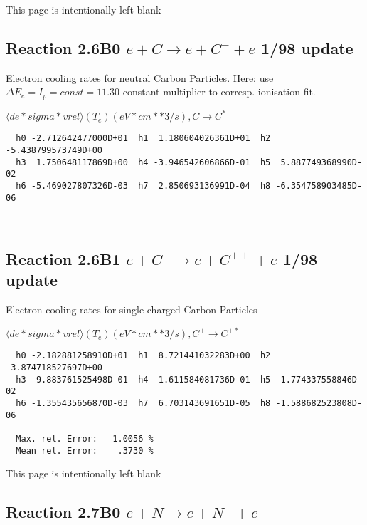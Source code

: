 \documentclass[12pt,dvipdfmx]{article}
\begin{document}
\newpage
This page is intentionally left blank
\newpage

\subsection{
Reaction 2.6B0 $e + C \rightarrow e + C^+ + e  $ 1/98 update
}

 Electron cooling rates for neutral
 Carbon Particles. Here: use $\Delta E_e = I_p = const = 11.30$
 constant multiplier to corresp. ionisation fit.

$  \langle de*sigma*vrel \rangle(T_e)  (eV*cm**3/s), C   \rightarrow C^* $


\begin{small}\begin{verbatim}
  h0 -2.712642477000D+01  h1  1.180604026361D+01  h2 -5.438799573749D+00
  h3  1.750648117869D+00  h4 -3.946542606866D-01  h5  5.887749368990D-02
  h6 -5.469027807326D-03  h7  2.850693136991D-04  h8 -6.354758903485D-06



\end{verbatim}\end{small}

\subsection{
Reaction 2.6B1 $e + C^+ \rightarrow e + C^{++} + e  $ 1/98 update
}

 Electron cooling rates for single
 charged Carbon Particles

 $ \langle de*sigma*vrel \rangle(T_e)  (eV*cm**3/s), C^+ \rightarrow C^{+*} $


\begin{small}\begin{verbatim}
  h0 -2.182881258910D+01  h1  8.721441032283D+00  h2 -3.874718527697D+00
  h3  9.883761525498D-01  h4 -1.611584081736D-01  h5  1.774337558846D-02
  h6 -1.355435656870D-03  h7  6.703143691651D-05  h8 -1.588682523808D-06

  Max. rel. Error:   1.0056 %
  Mean rel. Error:    .3730 %

\end{verbatim}\end{small}

\newpage
This page is intentionally left blank
\newpage

\subsection{
Reaction 2.7B0 $e + N \rightarrow e + N^{+} + e  $
}
\end{document}
